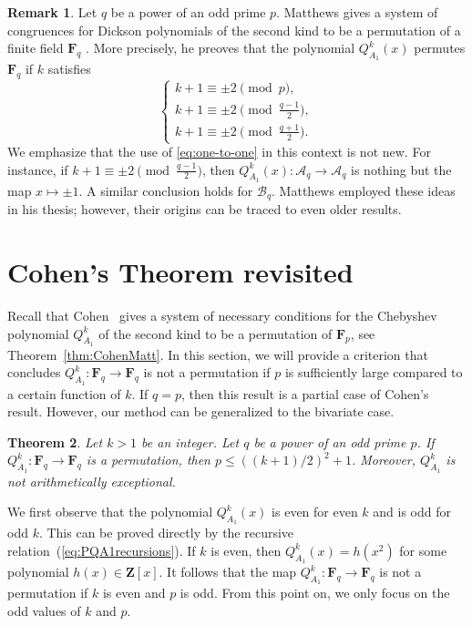 \documentclass{amsart}
\newcommand{\mc}{\mathcal}
\newcommand{\Z}{\mathbf Z}
\newcommand{\F}{\mathbf F}
\numberwithin{equation}{section}
\theoremstyle{plain}
\newtheorem{theorem}{Theorem}
\theoremstyle{definition}
\newtheorem{remark}[theorem]{Remark}
\begin{document}
\begin{remark}
Let $q$ be a power of an odd prime $p$. Matthews gives a system of congruences for Dickson polynomials of the second kind to be a permutation of a finite field $\F_q$ \cite[Theorem~2.5]{matthews1982}. More precisely, he preoves that the polynomial $Q^k_{A_1}(x)$ permutes $\F_q$ if $k$ satisfies
\[\begin{cases}
	k+1\equiv \pm2 \pmod p,\\
	k+1\equiv \pm2 \pmod{\frac{q-1}{2}},\\
	k+1\equiv \pm2 \pmod{\frac{q+1}{2}}.
\end{cases}\]
We emphasize that the use of \eqref{eq:one-to-one} in this context is not new. For instance, if $k+1\equiv \pm2 \pmod{\frac{q-1}{2}}$, then $Q^k_{A_1}(x):\mc{A}_{q} \rightarrow \mc{A}_{q}$ is nothing but the map $x\mapsto \pm 1$. A similar conclusion holds for $\mc{B}_{q}$. Matthews employed these ideas in his thesis; however, their origins can be traced to even older results.
\end{remark}











\section{Cohen's Theorem revisited}\label{section:A1}
Recall that Cohen~\cite{cohen1994} gives a system of necessary conditions for the Chebyshev polynomial $Q^k_{A_1}$ of the second kind to be a permutation of $\F_p$, see Theorem~\ref{thm:CohenMatt}. In this section, we will provide a criterion that concludes $Q_{A_1}^k: \F_q \rightarrow \F_q$ is not a permutation if $p$ is sufficiently large compared to a certain function of $k$. If $q=p$, then this result is a partial case of Cohen's result. However, our method can be generalized to the bivariate case.
\begin{theorem}\label{thm:A1main}
Let $k>1$ be an integer. Let $q$ be a power of an odd prime $p$. If $Q_{A_1}^k:\F_q \rightarrow \F_q$ is a permutation, then $p \leq ((k+1)/2)^2+1$. Moreover, $Q_{A_1}^k$ is not arithmetically exceptional.
\end{theorem}

We first observe that the polynomial $Q^k_{A_1}(x)$ is even for even $k$ and is odd for odd $k$. This can be proved directly by the recursive relation~(\ref{eq:PQA1recursions}). If $k$ is even, then $Q^k_{A_1}(x) = h(x^2)$ for some polynomial $h(x)\in\Z[x]$. It follows that the map $Q_{A_{1}}^{k} : \F_{q} \to \F_{q}$ is not a permutation if $k$ is even and $p$ is odd. From this point on, we only focus on the odd values of $k$ and $p$. 
\end{document}
